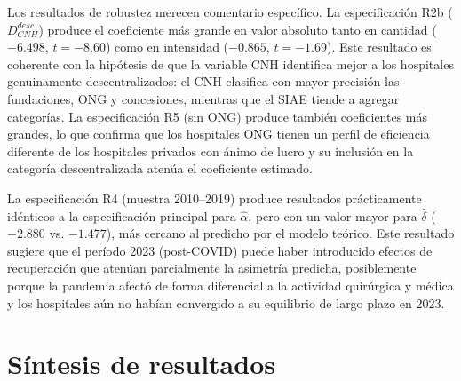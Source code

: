 Los resultados de robustez merecen comentario específico. La especificación R2b ($D^{desc}_{CNH}$) produce el coeficiente más grande en valor absoluto tanto en cantidad ($-6.498$, $t=-8.60$) como en intensidad ($-0.865$, $t=-1.69$). Este resultado es coherente con la hipótesis de que la variable CNH identifica mejor a los hospitales genuinamente descentralizados: el CNH clasifica con mayor precisión las fundaciones, ONG y concesiones, mientras que el SIAE tiende a agregar categorías. La especificación R5 (sin ONG) produce también coeficientes más grandes, lo que confirma que los hospitales ONG tienen un perfil de eficiencia diferente de los hospitales privados con ánimo de lucro y su inclusión en la categoría descentralizada atenúa el coeficiente estimado.

La especificación R4 (muestra 2010--2019) produce resultados prácticamente idénticos a la especificación principal para $\hat{\alpha}$, pero con un valor mayor para $\hat{\delta}$ ($-2.880$ vs. $-1.477$), más cercano al predicho por el modelo teórico. Este resultado sugiere que el período 2023 (post-COVID) puede haber introducido efectos de recuperación que atenúan parcialmente la asimetría predicha, posiblemente porque la pandemia afectó de forma diferencial a la actividad quirúrgica y médica y los hospitales aún no habían convergido a su equilibrio de largo plazo en 2023.

\section{Síntesis de resultados}

